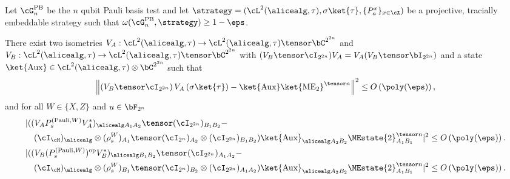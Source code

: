 \begin{theorem} \label{thm:soundnessPaulibasis}
	Let $\cG^{\text{PB}}_n$ be the $n$ qubit Pauli basis test and let $\strategy = (\cL^2(\alicealg, \tau), \sigma \ket{\tau}, \{P_a^x \}_{x \in \cX})$ be a projective, tracially embeddable strategy such that $\omega(\cG^{\text{PB}}_n, \strategy) \geq 1 - \eps$. 

	There exist two isometries $V_{A}: \cL^2(\alicealg, \tau) \rightarrow  \cL^2(\alicealg, \tau) \tensor \bC^{2^{2n}}$ and $V_{B}: \cL^2(\alicealg, \tau) \rightarrow \cL^2(\alicealg, \tau) \tensor \bC^{2^{2n}}$ with $( V_B \tensor \cI_{2^{2n}}) V_{A} =  V_{A} (V_B \tensor \bI_{2^{2n}})$ and a state $\ket{\text{Aux}} \in \cL^2(\alicealg, \tau) \otimes \bC^{2^{2n}}$ such that
	\begin{equation*} 
		\left\| \left(  V_B \tensor \cI_{2^{2n}}  \right) V_{A} \left(\sigma\ket{\tau}\right)  -\ket{\text{Aux}}  \ket{\text{ME}_2}^{\tensor n} \right\|^2 \leq O\left(\poly(\eps)\right),
	\end{equation*}
	and for all $W \in \{X, Z\}$ and $u \in \bF_{2^{n}}$
	\begin{align*} 
		&|  ((V_{A} P_s^{(\text{Pauli}, W)}  V_{A}^*)_{\alicealg A_1 A_2} \tensor (\cI_{2^{2n}} )_{B_1 B_2} - \\
		&\quad (\cI_{\cH})_{\alicealg} \otimes (\rho^{W}_s)_{A_1} \tensor (\cI_{2^{n}})_{A_2} \otimes  (\cI_{2^{2n}} )_{B_1 B_2} ) \ket{\text{Aux}}_{\alicealg A_2 B_2}  \MEstate{2}^{\tensor n}_{A_1 B_1}  |^2 \leq O\left(\poly(\eps )\right). \\
		&|  ((V_{B} (P_s^{(\text{Pauli}, W)})^{\text{op}}  V_{B}^*)_{\alicealg B_1 B_2} \tensor (\cI_{2^{2n}} )_{A_1 A_2} - \\
		&\quad (\cI_{\cH})_{\alicealg} \otimes (\rho^{W}_s)_{B_1} \tensor (\cI_{2^{n}})_{B_2} \otimes  (\cI_{2^{2n}} )_{A_1 A_2} ) \ket{\text{Aux}}_{\alicealg A_2 B_2}  \MEstate{2}^{\tensor n}_{A_1 B_1}  |^2 \leq O\left(\poly(\eps )\right). 
	\end{align*}


\end{theorem}
